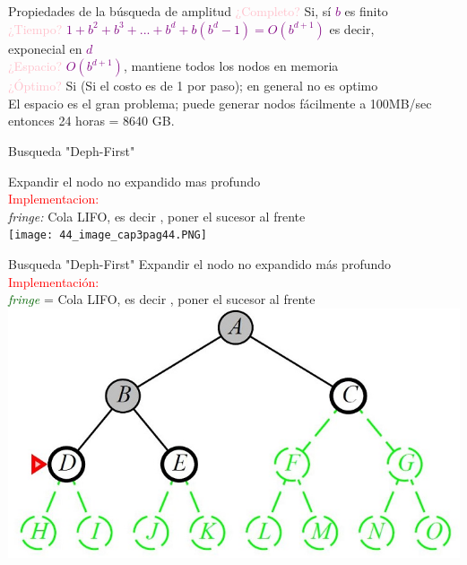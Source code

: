 \documentclass{beamer}
\theoremstyle{definition}
\theoremstyle{theorem}
\theoremstyle{remark}
\begin{document}
\begin{frame}{Propiedades de la búsqueda de amplitud}
\textcolor{Pink}{¿Completo?} Si, sí \textcolor{Purple}{$b$} es finito \\
\textcolor{Pink}{¿Tiempo?} \textcolor{Purple}{$1+b^2+b^3+...+b^d+b(b^d-1)=O(b^{d+1})$} es decir,\\    \hspace{9.3cm} exponecial en \textcolor{Purple}{$d$} \\
\textcolor{Pink}{¿Espacio?} \textcolor{Purple}{$O(b^{d+1})$}, mantiene todos los nodos en memoria \\
\textcolor{Pink}{¿Óptimo?} Si (Si el costo es de 1 por paso); en general no es optimo \\
                              El espacio es el gran problema; puede generar nodos fácilmente a 100MB/sec\\
                              entonces 24 horas = 8640 GB. \\
\end{frame}

\begin{frame}{Busqueda "Deph-First"}
    
    Expandir el nodo no expandido mas profundo
    \\\textcolor{red}{\large{Implementacion:}}
    \\\qquad\qquad\textit{fringe:} Cola LIFO, es decir , poner el sucesor al frente
    \\
    \centering
    \texttt{[image: 44\_image\_cap3pag44.PNG]}
    
\end{frame}

\begin{frame}{Busqueda "Deph-First"}
    Expandir el nodo no expandido más profundo
    \\
    \textcolor{Red}{\large{Implementación:}}
    \\
    \qquad\qquad\textcolor{DarkGreen}{\textit{fringe}} = Cola LIFO, es decir , poner el sucesor al frente
    \\
    \centering
    \includegraphics[scale=.5]{43_tree.JPG} 
\end{frame}
\end{document}
